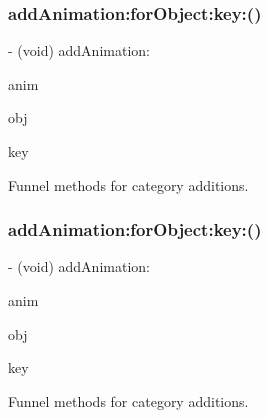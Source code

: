 \subsubsection{\texorpdfstring{add\+Animation\+:for\+Object\+:key\+:()}{addAnimation:forObject:key:()}\hspace{0.1cm}{\footnotesize\ttfamily [1/2]}}
{\footnotesize\ttfamily -\/ (void) add\+Animation\+: \begin{DoxyParamCaption}\item[{(\mbox{\hyperlink{interface_p_o_p_animation}{P\+O\+P\+Animation}} $\ast$)}]{anim }\item[{forObject:(id)}]{obj }\item[{key:(N\+S\+String $\ast$)}]{key }\end{DoxyParamCaption}\hspace{0.3cm}{\ttfamily [implementation]}}

Funnel methods for category additions. \mbox{\label{interface_p_o_p_animator_acb57d2ae51f4732276306c0923139edb}} 
\subsubsection{\texorpdfstring{add\+Animation\+:for\+Object\+:key\+:()}{addAnimation:forObject:key:()}\hspace{0.1cm}{\footnotesize\ttfamily [2/2]}}
{\footnotesize\ttfamily -\/ (void) add\+Animation\+: \begin{DoxyParamCaption}\item[{(\mbox{\hyperlink{interface_p_o_p_animation}{P\+O\+P\+Animation}} $\ast$)}]{anim }\item[{forObject:(id)}]{obj }\item[{key:(N\+S\+String $\ast$)}]{key }\end{DoxyParamCaption}\hspace{0.3cm}{\ttfamily [implementation]}}

Funnel methods for category additions. \mbox{\label{interface_p_o_p_animator_a5384718da6fd07fcaa8465d4ef79fd2f}} 
